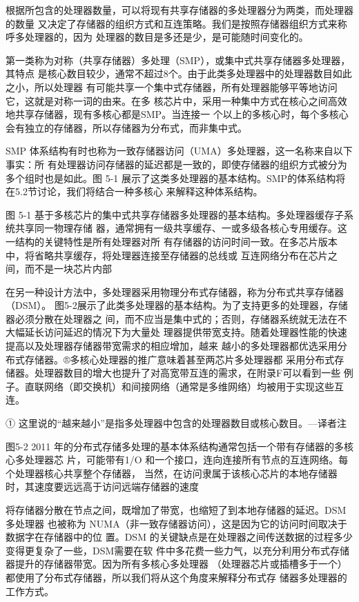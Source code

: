 根据所包含的处理器数量，可以将现有共享存储器的多处理器分为两类，而处理器的数量
又决定了存储器的组织方式和互连策略。我们是按照存储器组织方式来称呼多处理器的，因为
处理器的数目是多还是少，是可能随时间变化的。

第一类称为对称（共享存储器）多处理（SMP），或集中式共享存储器多处理器，其特点
是核心数目较少，通常不超过8个。由于此类多处理器中的处理器数目如此之小，所以处理器
有可能共享一个集中式存储器，所有处理器能够平等地访问它，这就是对称一词的由来。在多
核芯片中，采用一种集中方式在核心之间高效地共享存储器，现有多核心都是SMP。当连接一
个以上的多核心时，每个多核心会有独立的存储器，所以存储器为分布式，而非集中式。

SMP 体系结构有时也称为一致存储器访问（UMA）多处理器，这一名称来自以下事实：所
有处理器访问存储器的延迟都是一致的，即使存储器的组织方式被分为多个组时也是如此。图
5-1 展示了这类多处理器的基本结构。SMP的体系结构将在5.2节讨论，我们将结合一种多核心
来解释这种体系结构。


图 5-1
基于多核芯片的集中式共享存储器多处理器的基本结构。多处理器缓存子系统共享同一物理存储
器，通常拥有一级共享缓存、一或多级各核心专用缓存。这一结构的关键特性是所有处理器对所
有存储器的访问时间一致。在多芯片版本中，将省略共享缓存，将处理器连接至存储器的总线或
互连网络分布在芯片之间，而不是一块芯片内部

在另一种设计方法中，多处理器采用物理分布式存储器，称为分布式共享存储器（DSM）。
图5-2展示了此类多处理器的基本结构。为了支持更多的处理器，存储器必须分散在处理器之
间，而不应当是集中式的；否则，存储器系统就无法在不大幅延长访问延迟的情况下为大量处
理器提供带宽支持。随着处理器性能的快速提高以及处理器存储器带宽需求的相应增加，越来
越小的多处理器都优选采用分布式存储器。®多核心处理器的推广意味着甚至两芯片多处理器都
采用分布式存储器。处理器数目的增大也提升了对高宽带互连的需求，在附录F可以看到一些
例子。直联网络（即交换机）和间接网络（通常是多维网络）均被用于实现这些互连。

① 这里说的“越来越小”是指多处理器中包含的处理器数目或核心数目。—译者注

图5-2
2011 年的分布式存储多处理的基本体系结构通常包括一个带有存储器的多核心多处理器芯
片，可能带有1/O 和一个接口，连向连接所有节点的互连网络。每个处理器核心共享整个存储器，
当然，在访问隶属于该核心芯片的本地存储器时，其速度要远远高于访问远端存储器的速度

将存储器分散在节点之间，既增加了带宽，也缩短了到本地存储器的延迟。DSM多处理器
也被称为 NUMA（非一致存储器访问），这是因为它的访问时间取决于数据字在存储器中的位
置。DSM 的关键缺点是在处理器之间传送数据的过程多少变得更复杂了一些，DSM需要在软
件中多花费一些力气，以充分利用分布式存储器提升的存储器带宽。因为所有多核心多处理器
（处理器芯片或插槽多于一个）都使用了分布式存储器，所以我们将从这个角度来解释分布式存
储器多处理器的工作方式。

